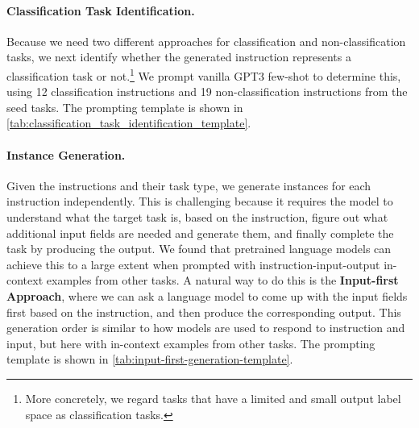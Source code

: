 \documentclass[11pt]{article}
\newcommand{\alisa}[1]{\textcolor{purple}{\textbf{[#1 -- \textsc{al}]}}}
\begin{document}
\paragraph{Classification Task Identification.}
Because we need two different approaches for classification and non-classification tasks, we next identify whether the generated instruction represents a classification task or not.\footnote{More concretely, we regard tasks that have a limited and small output label space as classification tasks.} 
We prompt vanilla GPT3 few-shot to determine this, using 12 classification instructions and 19 non-classification instructions from the seed tasks. The prompting template is shown in \autoref{tab:classification_task_identification_template}. 

\paragraph{Instance Generation.}
Given the instructions and their task type, we generate instances for each instruction independently. This is challenging because it requires the model to understand what the target task is, based on the instruction, figure out what additional input fields are needed and generate them, and finally complete the task by producing the output. We found that pretrained language models can achieve this to a large extent when prompted with instruction-input-output in-context examples from other tasks.
A natural way to do this is the \textbf{Input-first Approach}, where we can ask a language model to come up with the input fields first based on the instruction, and then produce the corresponding output. This generation order is similar to how models are used to respond to instruction and input, but here with in-context examples from other tasks. The prompting template is shown in \autoref{tab:input-first-generation-template}. 
\end{document}
